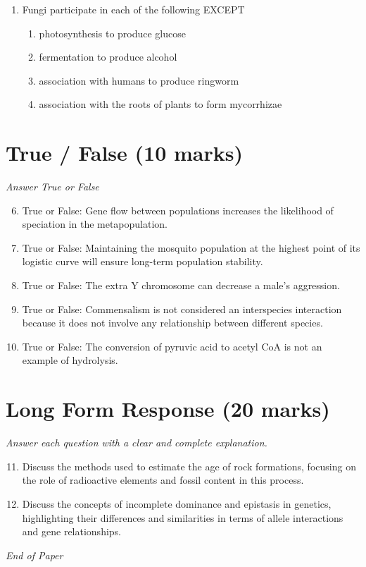 \documentclass[12pt]{article}
\begin{document}
\begin{enumerate}[label=\arabic*.]
\begin{enumerate}[label=(\alph*)]
    \item Aristotle, Darwin, and Lamarck
    \item Aristotle, Lyell, and Darwin
    \item Aristotle, Linnaeus, and Cuvier
    \item Aristotle, Cuvier, and Lamarck
    \item Linnaeus, Darwin, and Lamarck
\end{enumerate}
\item Fungi participate in each of the following EXCEPT
\begin{enumerate}[label=(\alph*)]
    \item photosynthesis to produce glucose
    \item fermentation to produce alcohol
    \item association with humans to produce ringworm
    \item association with the roots of plants to form mycorrhizae
\end{enumerate}
\end{enumerate}

\section*{True / False (10 marks)}
\textit{Answer True or False}
\begin{enumerate}[label=\arabic*.]
\setcounter{enumi}{5}
\item True or False: Gene flow between populations increases the likelihood of speciation in the metapopulation.
\item True or False: Maintaining the mosquito population at the highest point of its logistic curve will ensure long-term population stability.
\item True or False: The extra Y chromosome can decrease a male's aggression.
\item True or False: Commensalism is not considered an interspecies interaction because it does not involve any relationship between different species.
\item True or False: The conversion of pyruvic acid to acetyl CoA is not an example of hydrolysis.
\end{enumerate}

\section*{Long Form Response (20 marks)}
\textit{Answer each question with a clear and complete explanation.}
\begin{enumerate}[label=\arabic*.]
\setcounter{enumi}{10}
\item Discuss the methods used to estimate the age of rock formations, focusing on the role of radioactive elements and fossil content in this process.
\item Discuss the concepts of incomplete dominance and epistasis in genetics, highlighting their differences and similarities in terms of allele interactions and gene relationships.
\end{enumerate}

\vfill
\noindent\textit{End of Paper}
\end{document}
